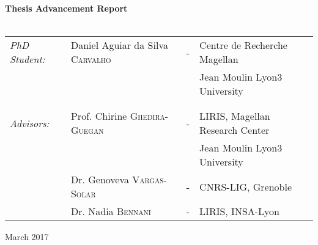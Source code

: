 \begin{titlepage}
\begin{center}
 \\
\vspace*{0.3cm}
 \\
\vspace*{2.5cm}
\noindent \LARGE \textbf{Thesis Advancement Report} \\
\vspace*{0.8cm}
 \\
\end{center}
\vspace*{1cm}
\begin{center}
\begin{tabular}{llcl}
   \large \textit{PhD Student:} & Daniel Aguiar da Silva \textsc{Carvalho} & - & Centre de Recherche Magellan\\
                         &                                          &   & Jean Moulin Lyon3 University\\
                         &&& \\
                         &&& \\
   \large \textit{Advisors:}    & Prof. Chirine \textsc{Ghedira-Guegan}    & - & LIRIS, Magellan Research Center\\
                                &                                          &   & Jean Moulin Lyon3 University\\
      				        & Dr. Genoveva \textsc{Vargas-Solar}	       & - & CNRS-LIG, Grenoble\\
      				        & Dr. Nadia \textsc{Bennani}                 & - & LIRIS, INSA-Lyon\\
\end{tabular}
\end{center}
\vspace*{6cm}
\begin{center}
March 2017
\end{center}
\end{titlepage}
\sloppy